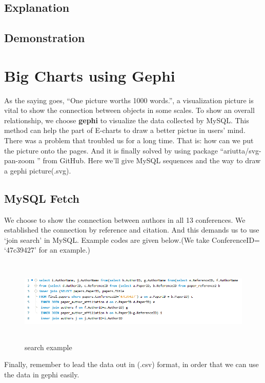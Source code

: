 \documentclass{book}
\begin{document}
\subsection{Explanation}

\subsection{Demonstration}


\section{Big Charts using Gephi}

As the saying goes, ``One picture worths 1000 words.'', a visualization picture is vital to show the connection between objects in some scales. To show an overall relationship, we choose  \textbf{gephi} to visualize the data collected by MySQL. This method can help the part of E-charts to draw a better pictue in users' mind. 
There was a problem that troubled us for a long time. That is: how can we put the picture onto the pages. And it is finally solved by using package ``ariutta/svg-pan-zoom
'' from GitHub. 
Here we'll give MySQL sequences and the way to draw a gephi picture(.svg).

\subsection{MySQL Fetch}

We choose to show the connection between authors in all 13 conferences. We established the connection by reference and citation. And this demands us to use `join search' in MySQL. Example codes are given below.(We take ConferenceID= `47c39427' for an example.)

\begin{figure}[H]
\centering
\includegraphics[height=4.0cm,width=18cm]{img/yhb_my_1.png}
\caption{search example}
\end{figure}

Finally, remember to lead the data out in (.csv) format, in order that we can use the data in gephi easily.
\end{document}
